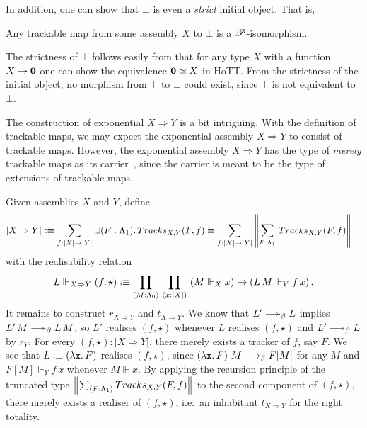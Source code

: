 \documentclass[a4paper,UKenglish,numberwithinsect,cleveref,thm-restate]{lipics-v2021}
\numberwithin{equation}{section}
\theoremstyle{plain}
\begin{document}
In addition, one can show that $\bot$ is even a \emph{strict} initial object. That is, 
\begin{proposition}\label{prop:strict-initial}
  Any trackable map from some assembly $X$ to $\bot$ is a $\mathscr{P}$-isomorphism. 
\end{proposition}
The strictness of $\bot$ follows easily from that for any type $X$ with a function $X \to \mathbf{0}$ one can show the equivalence $\mathbf{0} \simeq X$ in HoTT.
From the strictness of the initial object, no morphism from $\top$ to $\bot$ could exist, since $\top$ is not equivalent to $\bot$.

The construction of exponential $X \Rightarrow Y$ is a bit intriguing.
With the definition of trackable maps, we may expect the exponential assembly $X \Rightarrow Y$ to consist of trackable maps.
However, the exponential assembly $X \Rightarrow Y$ has the type of \emph{merely} trackable maps as its carrier~\cite{Kavvos2017b}, since the carrier is meant to be the type of extensions of trackable maps.
\begin{example}[Exponential]
  Given assemblies $X$ and $Y$, define
  \begin{align*}
    \bproj{X \Rightarrow Y} & \defeq \sm{f : |X| \to |Y|} \exis{F : \Lambda_1} \mathsf{Tracks}_{X, Y}(F, f) \equiv \sm{f : |X| \to |Y|} \brck{\sm{F : \Lambda_1} \mathsf{Tracks}_{X, Y}(F, f) }
  \end{align*}
  with the realisability relation 
  \[
    L \Vdash_{X \Rightarrow Y} (f, \star) \defeq \prd{M : \Lambda_0}{x : |X|} \left( M \Vdash_X x\right) \to \left(L\,M \Vdash_Y f\,x\right).
  \]
  It remains to construct $r_{X\Rightarrow Y}$ and $t_{X \Rightarrow Y}$. 
  We know that $L' \reduce L$ implies $L'\,M \reduce L\,M$, so $L'$ realises $(f, \star)$ whenever $L$ realises $(f, \star)$ and $L' \reduce L$ by $r_Y$.
  For every $(f, \star) : |X \Rightarrow Y|$, there merely exists a tracker of $f$, say $F$.
  We see that $L \vcentcolon\equiv \left(\mathtt{\lambda x}.\,F\right)$ realises $(f, \star)$, since
  $\left(\mathtt{\lambda x}.\,F\right)\,M \longrightarrow_{\beta} F[M]$ for any $M$ and $F[M] \Vdash_Y f\,x$ whenever $M \Vdash x$.
  By applying the recursion principle of the truncated type $\brck{\sm{F : \Lambda_1} \mathsf{Tracks}_{X, Y}(F, f) }$ to the second component of $(f, \star)$, there merely exists a realiser of $(f, \star)$, i.e.\ an inhabitant $t_{X \Rightarrow Y}$ for the right totality.

\end{example}
\end{document}

